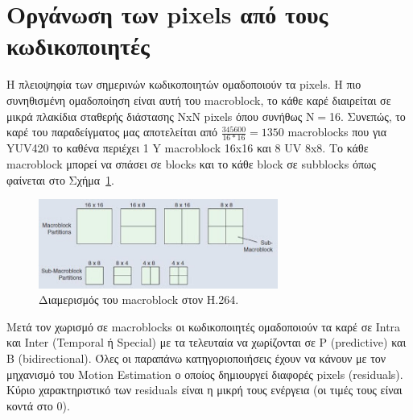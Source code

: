 \newpage
\section{Οργάνωση των pixels από τους κωδικοποιητές}
\label{section:sect23}

\indent Η πλειοψηφία των σημερινών κωδικοποιητών ομαδοποιούν τα pixels. Η πιο συνηθισμένη ομαδοποίηση είναι αυτή του macroblock, το κάθε καρέ διαιρείται σε μικρά πλακίδια σταθερής διάστασης NxN pixels όπου συνήθως N$=$16. Συνεπώς, το καρέ του παραδείγματος μας αποτελείται από $\frac{345600}{16*16} = 1350$ macroblocks που για YUV420 το καθένα περιέχει 1 Y macroblock 16x16 και 8 UV 8x8. Το κάθε macroblock μπορεί να σπάσει σε blocks και το κάθε block σε subblocks όπως φαίνεται στο Σχήμα~\ref{fig:mbpart}.

\begin{figure}[H]
  \centering
    \includegraphics[width=0.7\textwidth]{chapter2/mbpart.jpg}
  \caption{Διαμερισμός του macroblock στον H.264.\cite{misc:mbpart}}
  \label{fig:mbpart}
\end{figure}

\indent Μετά τον χωρισμό σε macroblocks οι κωδικοποιητές ομαδοποιούν τα καρέ σε Intra και Inter (Temporal ή Special) με τα τελευταία να χωρίζονται σε P (predictive) και Β (bidirectional). Όλες οι παραπάνω κατηγοριοποιήσεις έχουν να κάνουν με τον μηχανισμό του Motion Estimation ο οποίος δημιουργεί διαφορές pixels (residuals). Κύριο χαρακτηριστικό των residuals είναι η μικρή τους ενέργεια (οι τιμές τους είναι κοντά στο 0).


